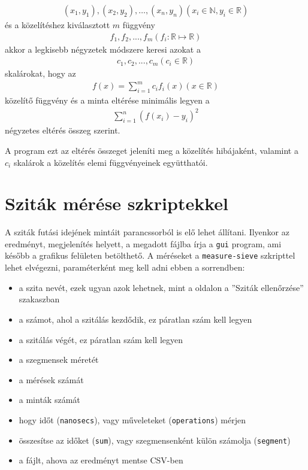 \begin{align*}
(x_1, y_1), (x_2, y_2), \ldots, (x_n, y_n) (x_i \in \mathbb{N}, y_i \in \mathbb{R})
\end{align*}
és a közelítéshez kiválasztott $m$ függvény
\begin{align*}
f_1, f_2, ..., f_m (f_i:\mathbb{R} \mapsto \mathbb{R})
\end{align*}
akkor a legkisebb négyzetek módszere keresi azokat a
\begin{align*}
c_1, c_2, ..., c_m (c_i \in \mathbb{R})
\end{align*}
skalárokat, hogy az
\begin{align*}
f(x)=\sum_{i=1}^m c_i f_i(x) (x \in \mathbb{R})
\end{align*}
közelítő függvény és a minta eltérése minimális
legyen a
\begin{align*}
\sum_{i=1}^{n} (f(x_i)-y_i)^2
\end{align*}
négyzetes eltérés összeg szerint.

A program ezt az eltérés összeget jeleníti meg a közelítés hibájaként, valamint a $c_i$ skalárok a közelítés elemi függvényeinek együtthatói.

\section{Sziták mérése szkriptekkel}

A sziták futási idejének mintáit parancssorból is elő lehet állítani.
Ilyenkor az eredményt, megjelenítés helyett, a megadott fájlba írja a \texttt{gui} program, ami később a grafikus felületen betölthető.
A méréseket a \texttt{measure-sieve} szkripttel lehet elvégezni, paraméterként meg kell adni ebben a sorrendben:
\begin{itemize}
\item a szita nevét, ezek ugyan azok lehetnek, mint a \pageref{sec:szitak-ellenorzese} oldalon a ''Sziták ellenőrzése'' szakaszban
\item a számot, ahol a szitálás kezdődik, ez páratlan szám kell legyen
\item a szitálás végét, ez páratlan szám kell legyen
\item a szegmensek méretét
\item a mérések számát
\item a minták számát
\item hogy időt (\texttt{nanosecs}), vagy műveleteket (\texttt{operations}) mérjen
\item összesítse az időket (\texttt{sum}), vagy szegmensenként külön számolja (\texttt{segment})
\item a fájlt, ahova az eredményt mentse CSV-ben
\end{itemize}

